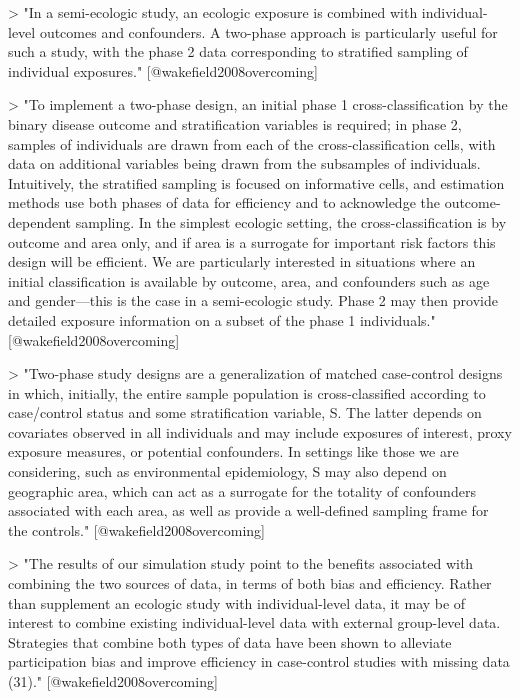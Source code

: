 > "In a semi-ecologic study, an ecologic exposure is combined with
individual-level outcomes and confounders. A two-phase approach is particularly
useful for such a study, with the phase 2 data corresponding to stratified
sampling of individual exposures." [@wakefield2008overcoming]

> "To implement a two-phase design, an initial phase 1 cross-classification by
the binary disease outcome and stratification variables is required; in phase 2,
samples of individuals are drawn from each of the cross-classification cells,
with data on additional variables being drawn from the subsamples of
individuals. Intuitively, the stratified sampling is focused on informative
cells, and estimation methods use both phases of data for efficiency and to
acknowledge the outcome-dependent sampling. In the simplest ecologic setting,
the cross-classification is by outcome and area only, and if area is a surrogate
for important risk factors this design will be efficient. We are particularly
interested in situations where an initial classification is available by
outcome, area, and confounders such as age and gender---this is the case in a
semi-ecologic study. Phase 2 may then provide detailed exposure information on a
subset of the phase 1 individuals." [@wakefield2008overcoming]

> "Two-phase study designs are a generalization of matched case-control designs
in which, initially, the entire sample population is cross-classified according
to case/control status and some stratification variable, S. The latter depends
on covariates observed in all individuals and may include exposures of interest, 
proxy exposure measures, or potential confounders. In settings like those we
are considering, such as environmental epidemiology, S may also depend on geographic
area, which can act as a surrogate for the totality of confounders associated
with each area, as well as provide a well-defined sampling frame for the controls."
[@wakefield2008overcoming]

> "The results of our simulation study point to the benefits associated with
combining the two sources of data, in terms of both bias and efficiency. Rather
than supplement an ecologic study with individual-level data, it may be of
interest to combine existing individual-level data with external group-level
data. Strategies that combine both types of data have been shown to alleviate
participation bias and improve efficiency in case-control studies with missing
data (31)." [@wakefield2008overcoming]

